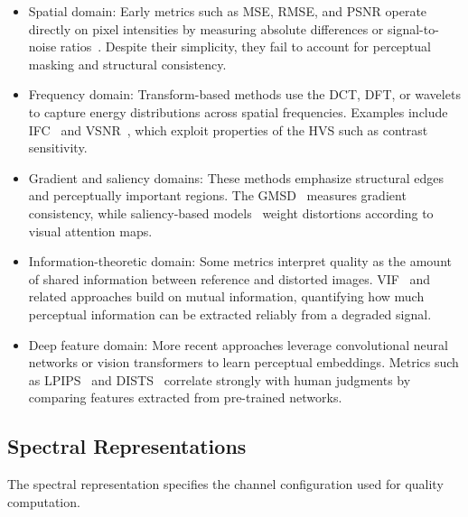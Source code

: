 \begin{itemize}
  \item Spatial domain: Early metrics such as \acf{MSE}, \acf{RMSE}, and \acf{PSNR} operate directly on pixel intensities by measuring absolute differences or signal-to-noise ratios~\cite{gonzalez2009digital}. Despite their simplicity, they fail to account for perceptual masking and structural consistency.
  \item Frequency domain: Transform-based methods use the \acf{DCT}, \acf{DFT}, or wavelets to capture energy distributions across spatial frequencies. Examples include \acf{IFC}~\cite{sheikh2005ifc} and \acf{VSNR}~\cite{chandler2007vsnr}, which exploit properties of the \acs{HVS} such as contrast sensitivity.
  \item Gradient and saliency domains: These methods emphasize structural edges and perceptually important regions. The \acf{GMSD}~\cite{xue2014gmsd} measures gradient consistency, while saliency-based models~\cite{hou2007saliency} weight distortions according to visual attention maps.
  \item Information-theoretic domain: Some metrics interpret quality as the amount of shared information between reference and distorted images. \acf{VIF}~\cite{sheikh2006vif} and related approaches build on mutual information, quantifying how much perceptual information can be extracted reliably from a degraded signal.
  \item Deep feature domain: More recent approaches leverage convolutional neural networks or vision transformers to learn perceptual embeddings. Metrics such as \acf{LPIPS}~\cite{zhang2018lpips} and \acf{DISTS}~\cite{ding2020dists} correlate strongly with human judgments by comparing features extracted from pre-trained networks.
\end{itemize}

\subsection{Spectral Representations}

The spectral representation specifies the channel configuration used for quality computation.

